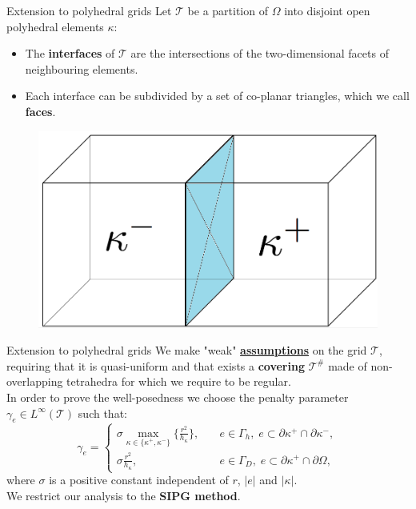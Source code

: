 \documentclass{beamer}
\begin{document}
\begin{frame}{Extension to polyhedral grids}
	Let $\mathcal{T}$ be a partition of	$\Omega$ into disjoint open
	polyhedral elements $\kappa$:
	\begin{itemize}
		\item The \textbf{interfaces} of $\mathcal{T}$ are the intersections of
		the two-dimensional facets of neighbouring elements.
		\item Each interface can be subdivided by a set of co-planar triangles,
		which we call \textbf{faces}.
	\end{itemize}
	\begin{figure}
		\centering
		\includegraphics[scale=0.2]{elements}
	\end{figure}
\end{frame}
\begin{frame}[label=main]{Extension to polyhedral grids}
	We make "weak"
	\hyperlink{supplemental}{\textbf{assumptions}} on the grid $\mathcal{T}$, 
	requiring that it is quasi-uniform and that	exists a
	\textbf{covering} $\mathcal{T}^\#$ made of non-overlapping
	tetrahedra for which we require to be regular.\\  
	\vspace*{0.5cm}
	In order to prove the well-posedness we choose the penalty parameter
	$\gamma_e \in L^\infty(\mathcal{T})$ such that:
	\begin{equation*} \label{eq:penalty}
	\gamma_e =
	\begin{cases}
	\sigma \max\limits_{\kappa \in \{\kappa^+, \kappa^-\}} \big\{
	\frac{r^2}{h_\kappa}\big\},
	& \quad e \in \Gamma_h, \; e \subset \partial\kappa^+ \cap
	\partial\kappa^-,\\
	\sigma\frac{r^2}{h_\kappa},& \quad e \in \Gamma_D, \; e \subset
	\partial\kappa^+ \cap \partial\Omega,
	\end{cases}
	\end{equation*}
	where $\sigma$ is a positive constant independent of $r$, $|e|$ and
	$|\kappa|$.\\
	We restrict our analysis to the \textbf{SIPG method}.
\end{frame}
\end{document}
